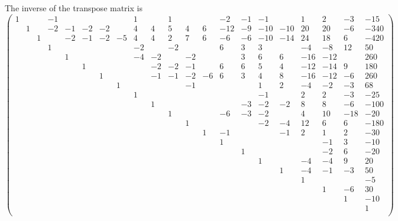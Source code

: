 \documentclass{siamltex}
\begin{document}
The inverse of the transpose matrix is
{\tiny
\[ 
\left(
\begin{array}{rrrrrrrrrrrrrrrrrrrrr}
1& & & -1& & & & & 1& & 1& & & -2& -1& -1& & 1& 2& -3& -15 \\
& 1& & -2& -1& -2& -2& & 4& 4& 5& 4& 6& -12& -9& -10& -10& 20& 20& -6& -340 \\
& & 1& & -2& -1& -2& -5& 4& 4& 2& 7& 6& -6& -6& -10& -14& 24& 18& 6& -420 \\
& & & 1& & & & & -2& & -2& & & 6& 3& 3& & -4& -8& 12& 50 \\
& & & & 1& & & & -4& -2& & -2& & & 3& 6& 6& -16& -12& & 260 \\
& & & & & 1& & & & -2& -2& -1& & 6& 6& 5& 4& -12& -14& 9& 180 \\
& & & & & & 1& & & -1& -1& -2& -6& 6& 3& 4& 8& -16& -12& -6& 260 \\
& & & & & & & 1& & & & -1& & & & 1& 2& -4& -2& -3& 68 \\
& & & & & & & & 1& & & & & & & -1& & 2& 2& -3& -25 \\
& & & & & & & & & 1& & & & & -3& -2& -2& 8& 8& -6& -100 \\
& & & & & & & & & & 1& & & -6& -3& -2& & 4& 10& -18& -20 \\
& & & & & & & & & & & 1& & & & -2& -4& 12& 6& 6& -180 \\
& & & & & & & & & & & & 1& -1& & & -1& 2& 1& 2& -30 \\
& & & & & & & & & & & & & 1& & & & & -1& 3& -10 \\
& & & & & & & & & & & & & & 1& & & & -2& 6& -20 \\
& & & & & & & & & & & & & & & 1& & -4& -4& 9& 20 \\
& & & & & & & & & & & & & & & & 1& -4& -1& -3& 50 \\
& & & & & & & & & & & & & & & & & 1& & & -5 \\
& & & & & & & & & & & & & & & & & & 1& -6& 30 \\
& & & & & & & & & & & & & & & & & & & 1& -10 \\
& & & & & & & & & & & & & & & & & & & & 1 \\
\end{array}
\right)
\]
}
\end{document}
